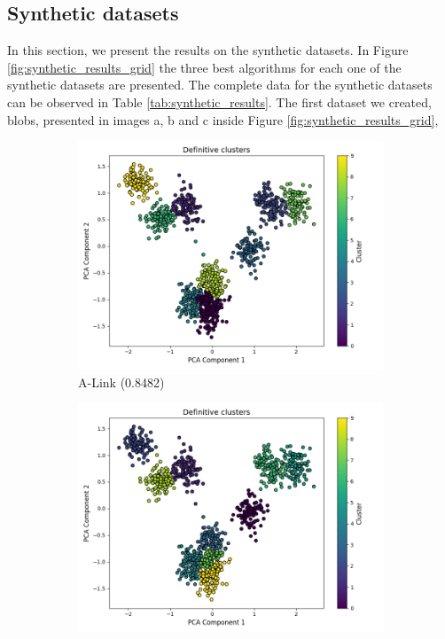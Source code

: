 \documentclass[
	10pt,
	parskip=half-,	
	paper=a4,
	english
	]{scrartcl}
\begin{document}
\subsection{Synthetic datasets}

In this section, we present the results on the synthetic datasets. In Figure \ref{fig:synthetic_results_grid} the three best algorithms for each one of the synthetic datasets are presented. The complete data for the synthetic datasets can be observed in Table \ref{tab:synthetic_results}. The first dataset we created, blobs, presented in images a, b and c inside Figure \ref{fig:synthetic_results_grid}, 

\begin{figure}[ht]
    \centering
    \begin{subfigure}[b]{0.3\textwidth}
        \includegraphics[width=\textwidth]{../data/plots/synthetic_noise_blobs_blobs_A-Link_structural_0.png}
        \caption{A-Link (0.8482)}
    \end{subfigure}
    \begin{subfigure}[b]{0.3\textwidth}
        \includegraphics[width=\textwidth]{../data/plots/synthetic_noise_blobs_blobs_PIC_structural_0.png}

\end{subfigure}
\end{figure}
\end{document}
